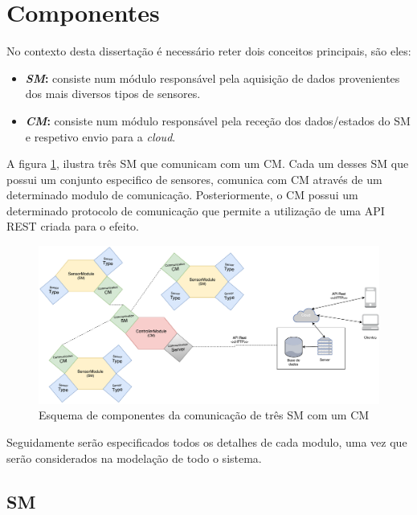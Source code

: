 \newpage
\section{Componentes}

No contexto desta dissertação é necessário reter dois conceitos principais, são eles: 

\begin{itemize}
	\item \textbf{\textit{\acl{SM}}:} consiste num módulo responsável pela aquisição de dados provenientes dos mais diversos tipos de sensores.
	
	
	\item \textbf{\textit{\acl{CM}}:} consiste num módulo responsável pela receção dos dados/estados do \acl{SM} e respetivo envio para a \textit{cloud}.  
	
\end{itemize}


A figura \ref{esquema1}, ilustra três \acl{SM} que comunicam com um \acl{CM}. Cada um desses \acl{SM} que possui um conjunto especifico de sensores, comunica com \acl{CM} através de um determinado modulo de comunicação. Posteriormente, o \acl{CM} possui um determinado protocolo de comunicação que permite a utilização de uma API REST criada para o efeito. 




\begin{figure}[h]
	\centering
	\includegraphics[width=\linewidth]{esquemas/general-electronic-modules.pdf}
	\caption{Esquema de componentes da comunicação de três \ac{SM} com um \ac{CM}}
	\label{esquema1}
\end{figure}


Seguidamente serão especificados todos os detalhes de cada modulo, uma vez que serão considerados na modelação de todo o sistema. 


\subsection{\acl{SM}}




